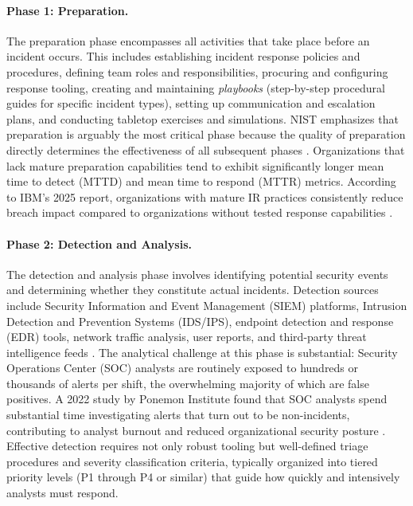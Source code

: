 \paragraph{Phase 1: Preparation.}
The preparation phase encompasses all activities that take place before an incident occurs.
This includes establishing incident response policies and procedures, defining team roles and responsibilities, procuring and configuring response tooling, creating and maintaining \textit{playbooks} (step-by-step procedural guides for specific incident types), setting up communication and escalation plans, and conducting tabletop exercises and simulations.
NIST emphasizes that preparation is arguably the most critical phase because the quality of preparation directly determines the effectiveness of all subsequent phases \citep{nist2025}.
Organizations that lack mature preparation capabilities tend to exhibit significantly longer mean time to detect (MTTD) and mean time to respond (MTTR) metrics.
According to IBM's 2025 report, organizations with mature IR practices consistently reduce breach impact compared to organizations without tested response capabilities \citep{ibm2025}.

\paragraph{Phase 2: Detection and Analysis.}
The detection and analysis phase involves identifying potential security events and determining whether they constitute actual incidents.
Detection sources include Security Information and Event Management (SIEM) platforms, Intrusion Detection and Prevention Systems (IDS/IPS), endpoint detection and response (EDR) tools, network traffic analysis, user reports, and third-party threat intelligence feeds \citep{nist2025}.
The analytical challenge at this phase is substantial: Security Operations Center (SOC) analysts are routinely exposed to hundreds or thousands of alerts per shift, the overwhelming majority of which are false positives.
A 2022 study by Ponemon Institute found that SOC analysts spend substantial time investigating alerts that turn out to be non-incidents, contributing to analyst burnout and reduced organizational security posture \citep{ponemon2022}.
Effective detection requires not only robust tooling but well-defined triage procedures and severity classification criteria, typically organized into tiered priority levels (P1 through P4 or similar) that guide how quickly and intensively analysts must respond.


